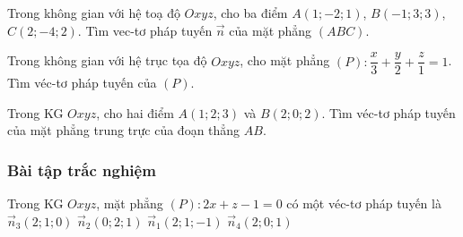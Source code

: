 \begin{vd}%
	
	Trong không gian với hệ toạ độ $Oxyz$, cho ba điểm $A\left( 1;-2;1 \right)$, $B\left( -1;3;3 \right)$, $C\left( 2;-4;2 \right)$. Tìm  vec-tơ pháp tuyến $\overrightarrow{n}$ của mặt phẳng $\left( ABC \right)$.
\end{vd}
\begin{vd}%
	Trong không gian với hệ trục tọa độ $Oxyz$, cho mặt phẳng $(P) \colon \dfrac{x}{3} + \dfrac{y}{2} + \dfrac{z}{1}=1$. Tìm véc-tơ pháp tuyến của $(P)$.
	
\end{vd}
\begin{vd}%
	Trong KG $Oxyz$, cho hai điểm $A(1;2;3)$ và $B(2;0;2)$. Tìm  véc-tơ pháp tuyến  của mặt phẳng trung trực của đoạn thẳng $AB$.
	
\end{vd}

\subsubsection{Bài tập trắc nghiệm}
\begin{ex}%
	Trong KG $Oxyz$, mặt phẳng $(P)\colon 2x + z - 1 = 0$ có một véc-tơ pháp tuyến là
	\choice
	{$ \overrightarrow{n}_{3} (2;1;0) $}
	{$ \overrightarrow{n}_{2} (0;2;1) $}
	{$ \overrightarrow{n}_{1} (2;1;-1) $}
	{\True $ \overrightarrow{n}_{4} (2;0;1) $}
\end{ex}

